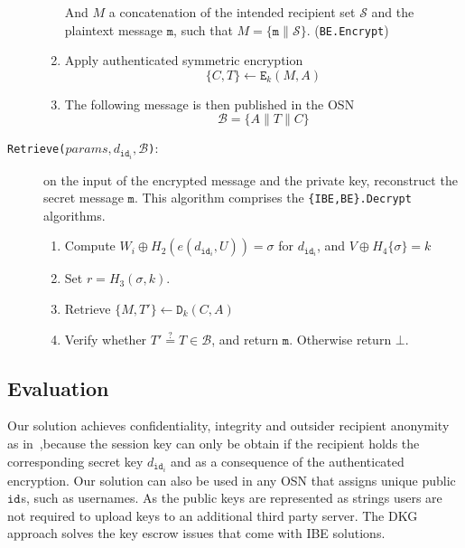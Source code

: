 \documentclass{llncs}
\newcommand{\msg}{\ensuremath{\mathtt{m}}}
\newcommand{\id}[1]{\ensuremath{\mathtt{id}_{#1}}}
\begin{document}
\begin{description}
\begin{enumerate}
        And $M$ a concatenation of the intended recipient set $\mathcal{S}$ and the plaintext message $\msg$, such that $M = \{ \msg \parallel \mathcal{S} \}$. (\texttt{BE.Encrypt})
    
        \item Apply authenticated symmetric encryption
        \begin{equation*}
            \{ C, T\} \leftarrow \mathtt{E}_k(M,A)
        \end{equation*}
        \item The following message is then published in the OSN
        \begin{equation*}
            \mathcal{B} = \{ A \parallel T \parallel C \}
        \end{equation*}
    \end{enumerate}


\bigskip 

    \item[\texttt{Retrieve($params, d_{\id{i}}, \mathcal{B}$)}:] on the input of the encrypted message and the private key, reconstruct the secret message \msg. This algorithm comprises the \texttt{\{IBE,BE\}.Decrypt} algorithms. \\

    \begin{enumerate}
        \item Compute $W_i \oplus H_2 \left( e \left( d_{\id{i}}, U \right) \right) = \sigma$ for $d_{\id{i}}$, and $V \oplus H_4 \{ \sigma \} = k$ 
        \item Set $r = H_3 \left( \sigma, k \right)$. %
        \item Retrieve $\{ M, T' \} \leftarrow \mathtt{D}_k(C, A)$
        \item Verify whether $T' \stackrel{?}{=} T \in \mathcal{B} $, and return $\msg$. Otherwise return $\bot$. 
    \end{enumerate}
\end{description}


\subsection{Evaluation}

Our solution achieves confidentiality, integrity and outsider recipient anonymity as in~\cite{BarthBonehWaters,BonehFranklinIBE,FazioOutsiderANOBE},because the session key can only be obtain if the recipient holds the corresponding secret key $d_{\id{i}}$ and as a consequence of the authenticated encryption. Our solution can also be used in any OSN that assigns unique public \id{}s, such as usernames. As the public keys are represented as strings  users are not required to upload keys to an additional third party server. The DKG approach solves the key escrow issues that come with IBE solutions.
\end{document}
